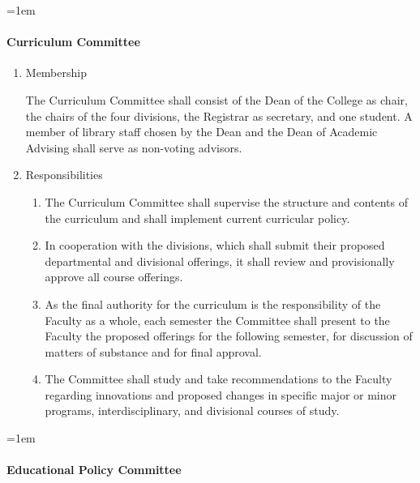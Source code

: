 \documentclass{manual}
\let\oldparagraph\paragraph
\renewcommand\paragraph{\leftskip=1em\oldparagraph}
\newcommand{\itemLevelA}{\alph*.}
\newcommand{\itemLevelB}{\arabic*)}
\newcommand{\itemRefA}{\alph*}
\newcommand{\itemRefB}{\arabic*}
\begin{document}
\paragraph{Curriculum Committee}

\begin{enumerate}[label=\itemLevelA,ref=\itemRefA]

\item Membership

The Curriculum Committee shall consist of the Dean of the College as chair, the chairs of the four divisions, the Registrar as secretary, and one student. A member of library staff chosen by the Dean and the Dean of Academic Advising shall serve as non-voting advisors.


\item Responsibilities
\begin{enumerate}[label=\itemLevelB,ref=\itemRefB]

\item The Curriculum Committee shall supervise the structure and contents of the curriculum and shall implement current curricular policy.

\item In cooperation with the divisions, which shall submit their proposed departmental and divisional offerings, it shall review and provisionally approve all course offerings.

\item As the final authority for the curriculum is the responsibility of the Faculty as a whole, each semester the Committee shall present to the Faculty the proposed offerings for the following semester, for discussion of matters of substance and for final approval.

\item The Committee shall study and take recommendations to the Faculty regarding innovations and proposed changes in specific major or minor programs, interdisciplinary, and divisional courses of study.

\end{enumerate}
\end{enumerate}


\paragraph{Educational Policy Committee}
\end{document}
